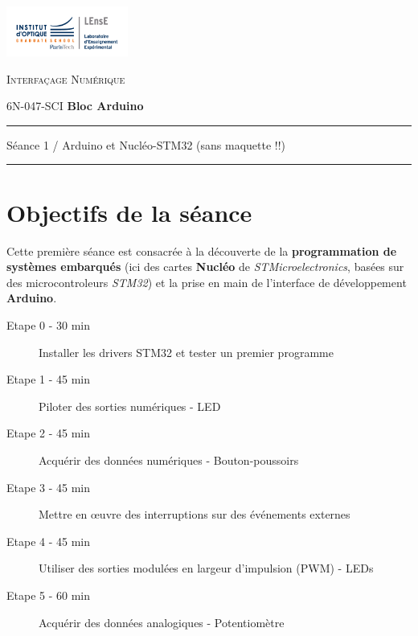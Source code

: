 \documentclass[a4paper,11pt,titlepage]{article} %
\begin{document}
\newpage
\strut %
\newpage
\strut %

\begin{minipage}[c]{.25\linewidth}
	\includegraphics[width=4cm]{images/Logo-LEnsE.png}
\end{minipage} \hfill
\begin{minipage}[c]{.4\linewidth}

\begin{center}
\vspace{0.3cm}
{\Large \textsc{Interfaçage Numérique}}

\medskip

6N-047-SCI \qquad \textbf{\Large Bloc Arduino}

\end{center}
\end{minipage}\hfill

\vspace{0.5cm}

\noindent \rule{\linewidth}{1pt}

{\noindent\Large \rule[-7pt]{0pt}{30pt} Séance 1 / Arduino et Nucléo-STM32 (sans maquette !!)} 

\noindent \rule{\linewidth}{1pt}


\section{Objectifs de la séance}

Cette première séance est consacrée à la découverte de la \textbf{programmation de systèmes embarqués} (ici des cartes \textbf{Nucléo} de \textit{STMicroelectronics}, basées sur des microcontroleurs \textit{STM32}) et la prise en main de l'interface de développement \textbf{Arduino}.


	\begin{description}
		\item[Etape 0 - 30 min] Installer les drivers STM32 et tester un premier programme
		\item[Etape 1 - 45 min] Piloter des sorties numériques - LED
		\item[Etape 2 - 45 min] Acquérir des données numériques - Bouton-poussoirs
		\item[Etape 3 - 45 min] Mettre en \oe{}uvre des interruptions sur des événements externes
		\item[Etape 4 - 45 min] Utiliser des sorties modulées en largeur d'impulsion (PWM) - LEDs
		\item[Etape 5 - 60 min] Acquérir des données analogiques - Potentiomètre
	\end{description}	
\end{document}
